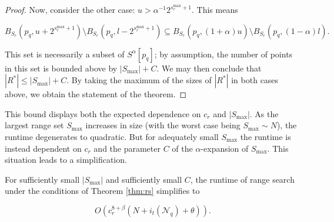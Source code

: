 \begin{proof}
Now, consider the other case: $u > \alpha^{-1} 2^{s_r^{\max} + 1}$.
This means

\begin{equation}
B_{S_r}(p_q, u + 2^{s_r^{\max} + 1}) \setminus B_{S_r}(p_q, l - 2^{s_r^{\max} +
1}) \subseteq B_{S_r}(p_q, (1 + \alpha) u) \setminus B_{S_r}(p_q, (1 - \alpha)
l).
\end{equation}

This set is necessarily a subset of $S^{\alpha}[p_q]$; by
assumption, the number of points in this set is bounded above by $|S_{\max}| +
C$.  We may then conclude that $|R^*| \le |S_{\max}| + C$.  By taking the
maximum of the sizes of $|R^*|$ in both cases above, we obtain the statement of
the theorem.
\end{proof}

This bound displays both the expected dependence on $c_r$ and $|S_{\max}|$.  As
the largest range set $S_{\max}$ increases in size (with the worst case being
$S_{\max} \sim N$), the runtime degenerates to quadratic.  But for adequately
small $S_{\max}$ the runtime is instead dependent on $c_r$ and the parameter $C$
of the $\alpha$-expansion of $S_{\max}$.  This situation leads to a
simplification.

\begin{cor}
For sufficiently small $|S_{\max}|$ and sufficiently small $C$, the runtime of
range search under the conditions of Theorem \ref{thm:rs} simplifies to

\begin{equation}
O(c_r^{8 + \beta} (N + i_t(\mathscr{N}_q) + \theta)).
\end{equation}
\label{cor:rs}
\end{cor}

%


